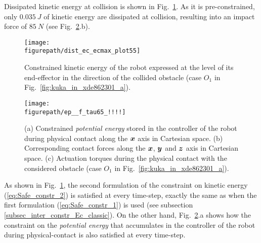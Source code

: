 Dissipated kinetic energy at collision is shown in Fig.~\ref{fig:dist_ec_ecmax_plot55}. As it is  pre-constrained, only $0.035~J$ of kinetic energy are dissipated at collision, resulting into an impact force of $85~N$ (see Fig.~\ref{fig:ep__f_tau65_!!!!}.b).
\begin{figure}[!htbp]
\centering
{\texttt{[image: \\figurepath/dist\_ec\_ecmax\_plot55]}}
\caption{Constrained kinetic energy of the robot expressed at the level of its end-effector in the direction of the collided obstacle (case $O_1$ in Fig.~\ref{fig:kuka_in_xde862301_a}).} 
\label{fig:dist_ec_ecmax_plot55}
\end{figure}
\begin{figure}[!htbp]
\centering
{\texttt{[image: \\figurepath/ep\_\_f\_tau65\_!!!!]}}
\caption{(a) Constrained \textit{potential energy} stored in the controller of the robot during physical contact along the $\mbox{\boldmath${x}$}$ axis in Cartesian space. (b) Corresponding contact forces along the $\mbox{\boldmath${x}$}$, $\mbox{\boldmath${y}$}$ and $\mbox{\boldmath${z}$}$ axis in Cartesian space. (c) Actuation torques during the physical contact with the considered obstacle (case $O_1$ in Fig.~\ref{fig:kuka_in_xde862301_a}).} 
\label{fig:ep__f_tau65_!!!!}
\end{figure}
As shown in Fig.~\ref{fig:dist_ec_ecmax_plot55}, the second formulation of the constraint on kinetic energy (\ref{eq:Safe_constr_2}) is satisfied at every time-step, exactly the same as when the first formulation (\ref{eq:Safe_constr_1}) is used (see subsection \ref{subsec_inter_constr_Ec_classic}). On the other hand, Fig.~\ref{fig:ep__f_tau65_!!!!}.a shows how the constraint on the \textit{potential energy} that accumulates in the controller of the robot during physical-contact is also satisfied at every time-step.
